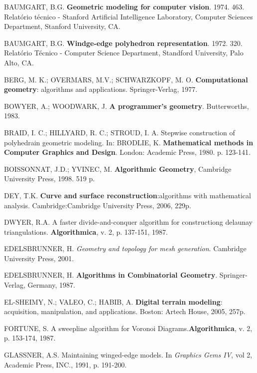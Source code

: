\documentclass[12pt,a4paper]{book}
\begin{document}
\begin{thebibliography}{99}

 BAUMGART, B.G. {\bf Geometric modeling for computer vision}. 1974. 463. Relat\'orio t\'ecnico - Stanford Artificial Intelligence Laboratory, Computer Sciences Department, Stanford University, CA.

 BAUMGART, B.G. {\bf Windge-edge polyhedron representation}. 1972. 320. Relat\'orio T\'ecnico - Computer Science Department, Standford University, Palo Alto, CA.

 BERG, M. K.; OVERMARS, M.V.; SCHWARZKOPF, M. O. {\bf Computational geometry}: algorithms and applications. Springer-Verlag, 1977.

 BOWYER, A.; WOODWARK, J. {\bf A programmer's geometry}. Butterworths, 1983.

 BRAID, I. C.; HILLYARD, R. C.; STROUD, I. A. Stepwise construction of polyhedrain geometric modeling. In: BRODLIE, K. {\bf Mathematical methods in Computer Graphics and Design}. London: Academic Press, 1980. p. 123-141.

 BOISSONNAT, J.D.; YVINEC, M. {\bf Algorithmic Geometry}, Cambridge University Press, 1998. 519 p.

 DEY, T.K. {\bf Curve and surface reconstruction}:algorithms with mathematical analysis. Cambridge:Cambridge University Press, 2006, 229p.

 DWYER, R.A. A faster divide-and-conquer algorithm for constructiong delaunay triangulations. {\bf Algorithmica}, v. 2, p. 137-151, 1987.

 EDELSBRUNNER, H. \textit{Geometry and topology for mesh generation}. Cambridge University Press, 2001.

 EDELSBRUNNER, H. {\bf Algorithms in Combinatorial Geometry}. Springer-Verlag, Germany, 1987.

 EL-SHEIMY, N.; VALEO, C.; HABIB, A. {\bf Digital terrain modeling}: acquisition, manipulation, and applications. Boston: Artech House, 2005, 257p.

 FORTUNE, S. A sweepline algorithm for Voronoi Diagrams.{\bf Algorithmica}, v. 2, p. 153-174, 1987.

 GLASSNER, A.S. Maintaining winged-edge models. In \emph{Graphics Gems IV}, vol 2, Academic Press, INC., 1991, p. 191-200.


\end{thebibliography}
\end{document}

